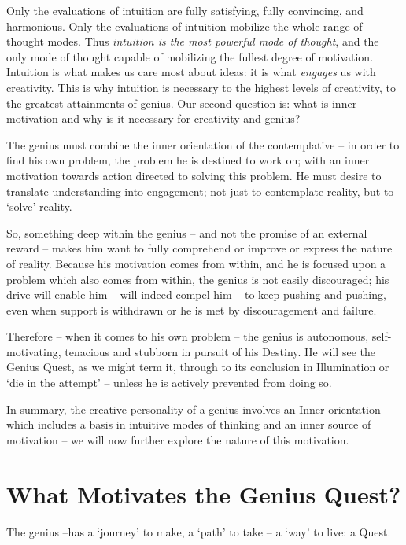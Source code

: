 \documentclass[
]{book}
\begin{document}
Only the evaluations of intuition are fully satisfying, fully convincing, and harmonious. Only the evaluations of intuition mobilize the whole range of thought modes. Thus \emph{intuition is the most powerful mode of thought}, and the only mode of thought capable of mobilizing the fullest degree of motivation. Intuition is what makes us care most about ideas: it is what \emph{engages} us with creativity. This is why intuition is necessary to the highest levels of creativity, to the greatest attainments of genius.
Our second question is: what is inner motivation and why is it necessary for creativity and genius?

The genius must combine the inner orientation of the contemplative -- in order to find his own problem, the problem he is destined to work on; with an inner motivation towards action directed to solving this problem. He must desire to translate understanding into engagement; not just to contemplate reality, but to `solve' reality.

So, something deep within the genius -- and not the promise of an external reward -- makes him want to fully comprehend or improve or express the nature of reality. Because his motivation comes from within, and he is focused upon a problem which also comes from within, the genius is not easily discouraged; his drive will enable him -- will indeed compel him -- to keep pushing and pushing, even when support is withdrawn or he is met by discouragement and failure.

Therefore -- when it comes to his own problem -- the genius is autonomous, self-motivating, tenacious and stubborn in pursuit of his Destiny. He will see the Genius Quest, as we might term it, through to its conclusion in Illumination or `die in the attempt' -- unless he is actively prevented from doing so.

In summary, the creative personality of a genius involves an Inner orientation which includes a basis in intuitive modes of thinking and an inner source of motivation -- we will now further explore the nature of this motivation.

\hypertarget{what-motivates-the-genius-quest}{%
\chapter{What Motivates the Genius Quest?}\label{what-motivates-the-genius-quest}}

The genius --has a `journey' to make, a `path' to take -- a `way' to live: a Quest.
\end{document}
